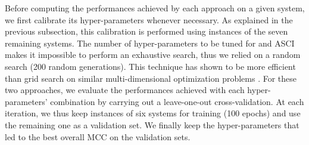 \begin{table}
\caption{Hyper-parameters Tuning} 
\label{Table: hyper-parameters tuning}
\centering
{}
\end{table}

Before computing the performances achieved by each approach on a given system, we first calibrate its hyper-parameters whenever necessary. As explained in the previous subsection, this calibration is performed using instances of the seven remaining systems. The number of hyper-parameters to be tuned for \NAME{} and ASCI makes it impossible to perform an exhaustive search, thus we relied on a random search (200 random generations). This technique has shown to be more efficient than grid search on similar multi-dimensional optimization problems \cite{bergstra2012random}.
For these two approaches, we evaluate the performances achieved with each hyper-parameters' combination by carrying out a leave-one-out cross-validation. At each iteration, we thus keep instances of six systems for training (100 epochs) and use the remaining one as a validation set. We finally keep the hyper-parameters that led to the best overall MCC on the validation sets.

